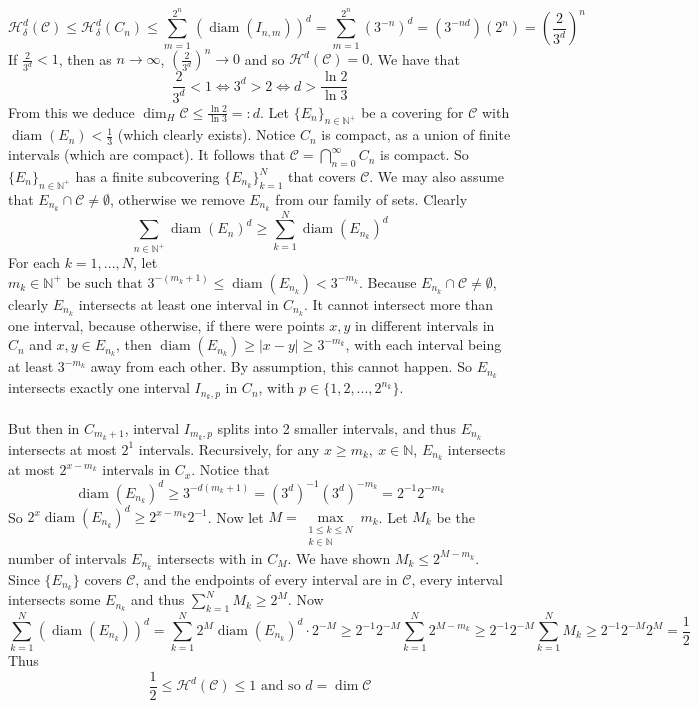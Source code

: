 \documentclass{article}
\theoremstyle{plain}
\theoremstyle{definition}
\DeclareMathOperator{\diam}{diam}
\theoremstyle{remark}
\begin{document}
\[\mathcal{H}_{\delta}^d(\mathcal{C})  \le \mathcal{H}_\delta ^d(C_n) \le \sum \limits _{m=1}^{2^{n}} (\diam (I_{n,m}))^d=\sum \limits  _{m=1}^{2^{n}} (3^{-n})^d= (3^{-nd})(2^{n})= \left (\frac{2}{3^d} \right)^{n}\]
If $\frac{2}{3^d} < 1$, then as $n \to \infty$, $(\frac{2}{3^d})^n \to 0$ and so $\mathcal{H} ^d(\mathcal{C})=0$. We have that \[\frac{2}{3^d} < 1 \iff 3^d > 2 \iff d > \frac{\ln 2}{ \ln 3}\]
From this we deduce $\dim _H \mathcal{C} \le \frac{\ln 2}{\ln 3} =: d$. Let $\{E_n\}_{n\in \mathbb{N}^+}$ be a covering for $\mathcal{C}$ with $\diam (E_{n})< \frac{1}{3}$ (which clearly exists). Notice $C_n$ is compact, as a union of finite intervals (which are compact). It follows that $\mathcal{C} = \bigcap \limits _{n=0}^\infty C_n$ is compact. So $\{E_n\}_{n\in \mathbb{N}^+}$ has a finite subcovering $\{E_{n_k}\}_{k=1}^N$ that covers $\mathcal{C}$. We may also assume that $E_{n_k} \cap \mathcal{C} \ne \emptyset $, otherwise we remove $E_{n_k}$ from our family of sets. Clearly \[
\sum \limits _{n\in \mathbb{N}^+}\diam (E_n)^d \ge \sum \limits _{k=1 }^N \diam (E_{n_k})^d
\]
For each $k=1,...,N$, let  $m_k \in \mathbb{N}^+ \text{ be such that }3^{-(m_k+1)} \le \diam (E_{n_k})< 3^{-m_k}$.
Because $E_{n_k} \cap \mathcal{C} \ne \emptyset$, clearly $E_{n_k}$ intersects at least one interval in $C_{n_k}$. It cannot intersect more than one interval, because otherwise, if there were points $x, y$ in different intervals in $C_n$ and $x,y \in E_{n_k}$, then $\diam (E_{n_k}) \ge |x-y| \ge 3^{-m_k}$, with each interval being at least $3^{-m_k}$ away from each other. By assumption, this cannot happen. So $E_{n_k}$ intersects exactly one interval $I_{n_k, p}$ in $C_n$, with $p \in \{1,2,...,2^{n_k}\}$. 
~\\~\\
But then in $C_{m_k+1}$, interval $I_{m_k, p}$ splits into 2 smaller intervals, and thus $E_{n_k}$ intersects at most $2^{1}$ intervals. Recursively, for any $x \ge m_k,\  x \in \mathbb{N}$, $E_{n_k}$ intersects at most $2^{x-m_k}$ intervals in $C_x$. Notice that \[\diam(E_{n_k})^d \ge 3^{-d(m_k+1)}=(3^{d})^{-1}(3^{d})^{-m_k}=2^{-1}2^{-m_k}\] So $2^x \diam (E_{n_k})^{d} \ge 2^{x-m_k} 2^{-1}$.
Now let $M = \max \limits _{\substack{1\le k\le N \\ k \in \mathbb{N}}}m_k$. Let $M_k$ be the number of intervals $E_{n_k}$ intersects with in $C_M$. We have shown $M_k \le 2^{M-m_k}$. Since $\{E_{n_k}\}$ covers $\mathcal{C}$, and the endpoints of every interval are in $\mathcal{C}$, every interval intersects some $E_{n_k}$ and thus $\sum\limits _{k=1}^{N} M_k \ge 2^{M}$. Now \[\sum \limits _{k=1}^N(\diam (E_{n_k}))^d =\sum \limits _{k=1}^N2^M \diam (E_{n_k})^d \cdot 2^{-M} \ge 2^{-1} 2^{-M}\sum \limits _{k=1}^N2^{M-m_k}\ge2^{-1}2^{-M}\sum \limits _{k=1}^NM_k \ge 2^{-1}2^{-M}2^M = \frac{1}{2}\]Thus \[\frac{1}{2} \le \mathcal{H}^d(\mathcal{C}) \le 1 \text{ and so } d = \dim \mathcal{C}\]
\end{document}
